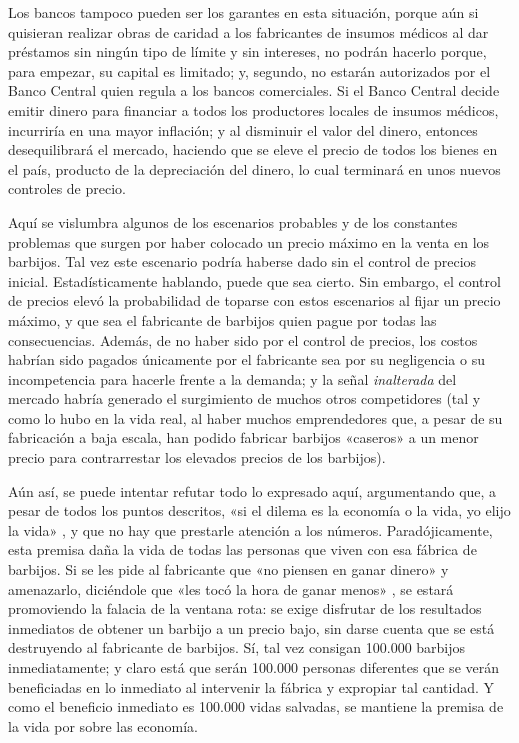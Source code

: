 \documentclass[12pt,a4paper,twoside]{book}
\begin{document}
Los bancos tampoco pueden ser los garantes en esta situación, porque aún si quisieran realizar obras de caridad a los fabricantes de insumos médicos al dar préstamos sin ningún tipo de límite y sin intereses, no podrán hacerlo porque, para empezar, su capital es limitado; y, segundo, no estarán autorizados por el Banco Central quien regula a los bancos comerciales. Si el Banco Central decide emitir dinero para financiar a todos los productores locales de insumos médicos, incurriría en una mayor inflación; y al disminuir el valor del dinero, entonces desequilibrará el mercado, haciendo que se eleve el precio de todos los bienes en el país, producto de la depreciación del dinero, lo cual terminará en unos nuevos controles de precio.

Aquí se vislumbra algunos de los escenarios probables y de los constantes problemas que surgen por haber colocado un precio máximo en la venta en los barbijos. Tal vez este escenario podría haberse dado sin el control de precios inicial. Estadísticamente hablando, puede que sea cierto. Sin embargo, el control de precios elevó la probabilidad de toparse con estos escenarios al fijar un precio máximo, y que sea el fabricante de barbijos quien pague por todas las consecuencias. Además, de no haber sido por el control de precios, los costos habrían sido pagados únicamente por el fabricante sea por su negligencia o su incompetencia para hacerle frente a la demanda; y la señal \textit{inalterada} del mercado habría generado el surgimiento de muchos otros competidores (tal y como lo hubo en la vida real, al haber muchos emprendedores que, a pesar de su fabricación a baja escala, han podido fabricar barbijos «caseros» a un menor precio para contrarrestar los elevados precios de los barbijos).

Aún así, se puede intentar refutar todo lo expresado aquí, argumentando que, a pesar de todos los puntos descritos, «si el dilema es la economía o la vida, yo elijo la vida» \cite{mineuquen:falsodilema}, y que no hay que prestarle atención a los números. Paradójicamente, esta premisa daña la vida de todas las personas que viven con esa fábrica de barbijos. Si se les pide al fabricante que «no piensen en ganar dinero» y amenazarlo, diciéndole que «les tocó la hora de ganar menos» \cite{infobae:ganar-menos}, se estará promoviendo la falacia de la ventana rota: se exige disfrutar de los resultados inmediatos de obtener un barbijo a un precio bajo, sin darse cuenta que se está destruyendo al fabricante de barbijos. Sí, tal vez consigan 100.000 barbijos inmediatamente; y claro está que serán 100.000 personas diferentes que se verán beneficiadas en lo inmediato al intervenir la fábrica y expropiar tal cantidad. Y como el beneficio inmediato es 100.000 vidas salvadas, se mantiene la premisa de la vida por sobre las economía.
\end{document}
